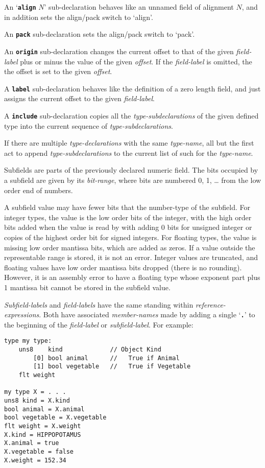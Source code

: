 \documentclass[12pt]{article}
\newcommand{\TT}[1]{{\tt \bfseries #1}}
\newcommand{\ttkey}[1]{{\tt \bfseries #1}}
\newenvironment{indpar}[1][0.3in]%
	{\begin{list}{}%
		     {\setlength{\itemsep}{0in}%
		      \setlength{\topsep}{0in}%
		      \setlength{\parsep}{1ex}%
		      \setlength{\labelwidth}{#1}%
		      \setlength{\leftmargin}{#1}%
		      \addtolength{\leftmargin}{\labelsep}}%
	 \item}%
	{\end{list}}
\begin{document}
An `\ttkey{align} $N$' sub-declaration behaves like an unnamed
field of alignment $N$, and in addition sets the align/pack switch
to `align'.

An \ttkey{pack} sub-declaration sets the align/pack switch to `pack'.

An \ttkey{origin} sub-declaration changes the current offset to that
of the given {\em field-label} plus or minus the value of the
given {\em offset}.  If the {\em field-label} is omitted, the
the offset is set to the given {\em offset}.

A \ttkey{label} sub-declaration behaves like the definition of a
zero length field, and just assigns the current offset to the
given {\em field-label}.

A \ttkey{include} sub-declaration copies all the {\em type-subdeclarations}
of the given defined type into the current sequence of
{\em type-subdeclarations}.

If there are multiple {\em type-declarations} with the same
{\em type-name}, all but the first act to append {\em type-subdeclarations}
to the current list of such for the {\em type-name}.

Subfields are parts of the previously declared numeric field.
The bits occupied
by a subfield are given by its {\em bit-range}, where bits are numbered
0, 1, \ldots{} from the low order end of numbers.

A subfield value may have fewer bits that the number-type of the subfield.
For integer types, the value is the low order bits of the integer, with
the high order bits added when the value is read by with adding 0 bits
for unsigned integer or copies of the highest order bit for signed integers.
For floating types, the value is missing low order mantissa bits, which
are added as zeros.  If a value outside the representable range is stored,
it is not an error.  Integer values are truncated, and floating values
have low order mantissa bits dropped (there is no rounding).  However, it is
an assembly error to have a floating type whose exponent part plus
1 mantissa bit cannot be stored in the subfield value.

{\em Subfield-labels} and {\em field-labels} have the same standing within
{\em reference-expressions}.
Both have associated {\em member-names} made by adding a single
`\TT{.}' to the beginning of the {\em field-label} or {\em subfield-label}.
For example:

\begin{indpar}\begin{verbatim}
type my type:
    uns8    kind             // Object Kind
        [0] bool animal      //   True if Animal
        [1] bool vegetable   //   True if Vegetable
    flt weight

my type X = . . .
uns8 kind = X.kind
bool animal = X.animal
bool vegetable = X.vegetable
flt weight = X.weight
X.kind = HIPPOPOTAMUS
X.animal = true 
X.vegetable = false
X.weight = 152.34
\end{verbatim}\end{indpar}
\end{document}
